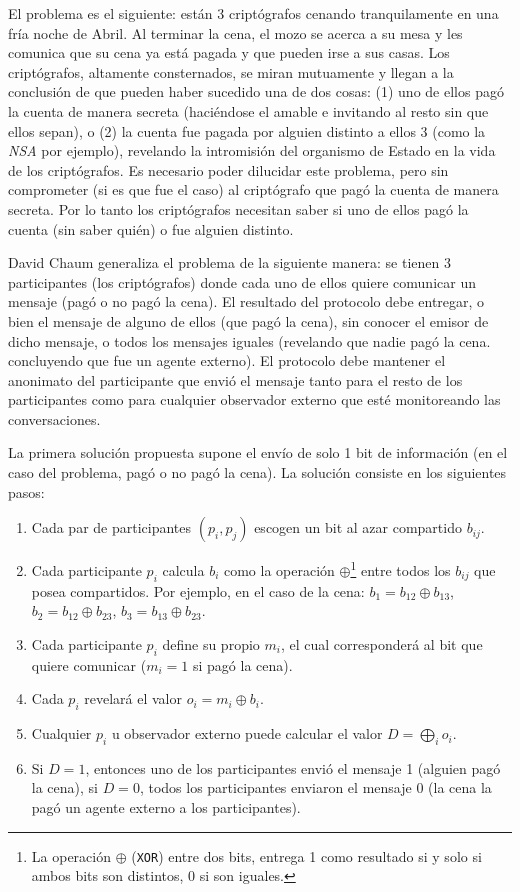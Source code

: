 El problema es el siguiente: están 3 criptógrafos cenando tranquilamente en una fría noche de Abril. Al terminar la cena, el mozo 
se acerca a su mesa y les comunica que su cena ya está pagada y que pueden irse a sus casas. Los criptógrafos, altamente consternados, 
se miran mutuamente y llegan a la conclusión de que pueden haber sucedido una de dos cosas: (1) uno de ellos pagó la cuenta de manera 
secreta (haciéndose el amable e invitando al resto sin que ellos sepan), o (2) la cuenta fue pagada por alguien distinto a ellos 3 
(como la \emph{NSA} por ejemplo), revelando la intromisión del organismo de Estado en la vida de los criptógrafos. Es necesario poder 
dilucidar este problema, pero sin comprometer (si es que fue el caso) al criptógrafo que pagó la cuenta de manera secreta. Por lo tanto 
los criptógrafos necesitan saber si uno de ellos pagó la cuenta (sin saber quién) o fue alguien distinto.

David Chaum generaliza el problema de la siguiente manera: se tienen 3 participantes (los criptógrafos) donde cada uno de ellos quiere 
comunicar un mensaje (pagó o no pagó la cena). El resultado del protocolo debe entregar, o bien el mensaje de alguno de ellos 
(que pagó la cena),  sin conocer el emisor de dicho mensaje, o todos los mensajes iguales (revelando que nadie pagó la cena. concluyendo 
que fue un agente externo). El protocolo debe mantener el anonimato del participante que envió el mensaje tanto para el resto de los 
participantes como para cualquier observador externo que esté monitoreando las conversaciones.

La primera solución propuesta supone el envío de solo 1 bit de información (en el caso del problema, pagó o no pagó la cena). 
La solución consiste en los siguientes pasos:
\begin{enumerate}
    \item Cada par de participantes $(p_i, p_j)$ escogen un bit al azar compartido $b_{ij}$.
    \item Cada participante $p_i$ calcula $b_i$ como la operación $\oplus$\footnote{La operación $\oplus$ (\texttt{XOR}) entre 
    dos bits, entrega 1 como resultado si y solo si ambos bits son distintos, 0 si son iguales.} entre todos los $b_{ij}$ que posea 
    compartidos. Por ejemplo, en el caso de la cena: $b_1 = b_{12} \oplus b_{13}$, $b_2 = b_{12} \oplus b_{23}$, $b_3 = b_{13} \oplus b_{23}$.
    \item Cada participante $p_i$ define su propio $m_i$, el cual corresponderá al bit que quiere comunicar ($m_i = 1$ si pagó la cena).
    \item Cada $p_i$ revelará el valor $o_i = m_i \oplus b_i$.
    \item Cualquier $p_i$ u observador externo puede calcular el valor $D = \displaystyle\bigoplus_i o_i$.
    \item Si $D = 1$, entonces uno de los participantes envió el mensaje 1 (alguien pagó la cena), si $D = 0$, todos los participantes 
    enviaron el mensaje 0 (la cena la pagó un agente externo a los participantes).
\end{enumerate}

